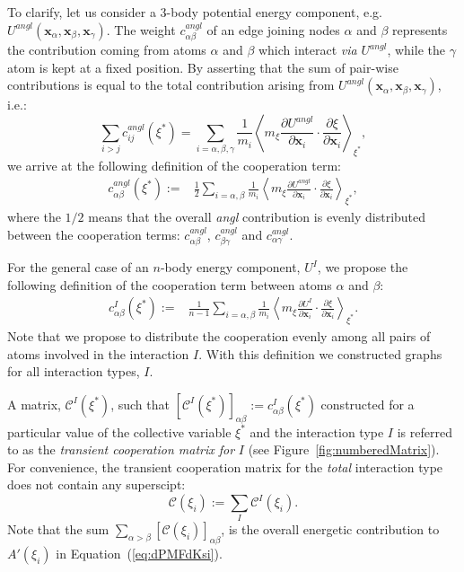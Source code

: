 \documentclass[a4paper,11pt,twoside]{book}%
\begin{document}
To clarify, let us consider a 3-body potential energy component, e.g. $U^{angl}(\mathbf{x}_\alpha,\mathbf{x}_\beta,\mathbf{x}_\gamma)$.
The weight $c^{angl}_{\alpha\beta}$ of an edge joining nodes $\alpha$ and $\beta$  represents the contribution coming from atoms $\alpha$ and $\beta$ which interact \emph{via} $U^{angl}$, while the $\gamma$ atom is kept at a fixed position.
By asserting that the sum of pair-wise contributions is equal to the total contribution arising from $U^{angl}(\mathbf{x}_\alpha,\mathbf{x}_\beta,\mathbf{x}_\gamma)$, i.e.:
$$\sum_{i>j}c^{angl}_{ij}(\xi^*)=\sum_{i=\alpha,\beta,\gamma}\frac{1}{m_i} \left\langle m_\xi \frac{\partial U^{angl}}{\partial \mathbf{x}_i}\cdot\frac{\partial\xi}{\partial\mathbf{x}_i} \right\rangle_{\xi^*},$$
we arrive at the following definition of the cooperation term:
\begin{align}
\nonumber c_{\alpha\beta}^{angl}(\xi^*):=&\frac{1}{2}\sum_{i=\alpha,\beta}\frac{1}{m_i} \left\langle m_\xi \frac{\partial U^{angl}}{\partial \mathbf{x}_i}\cdot\frac{\partial\xi}{\partial\mathbf{x}_i} \right\rangle_{\xi^*},
\end{align}
where the $1/2$ means that the overall \emph{angl} contribution is evenly distributed between the cooperation terms: $c_{\alpha\beta}^{angl}$, $c_{\beta\gamma}^{angl}$ and $c_{\alpha\gamma}^{angl}$.

For the general case of an $n$-body energy component, $U^I$, we propose the following definition of the cooperation term between atoms $\alpha$ and $\beta$:
\begin{align}
\nonumber c_{\alpha\beta}^{I}(\xi^*):=&\frac{1}{n-1}\sum_{i=\alpha,\beta}\frac{1}{m_i} \left\langle m_\xi \frac{\partial U^{I}}{\partial \mathbf{x}_i}\cdot\frac{\partial\xi}{\partial\mathbf{x}_i} \right\rangle_{\xi^*}.
\end{align}
Note that we propose to distribute the cooperation evenly among all pairs of atoms involved in the interaction $I$.
With this definition we constructed graphs for all interaction types, $I$.

A matrix, $\mathcal{C}^{I}(\xi^*)$, such that $[\mathcal{C}^I(\xi^*)]_{\alpha\beta}:=c^I_{\alpha\beta}(\xi^*)$ constructed for a particular value of the collective variable $\xi^*$ and the interaction type $I$ is referred to as the \emph{transient cooperation matrix for} $I$ {\color{black}(see Figure~\ref{fig:numberedMatrix})}.
For convenience, the transient cooperation matrix for the \emph{total} interaction type does not contain any superscipt: $$\mathcal{C}(\xi_i):=\sum_I\mathcal{C}^I(\xi_i).$$
Note that the sum $\sum_{\alpha>\beta}[\mathcal{C}(\xi_i)]_{\alpha\beta}$, is the overall energetic contribution to $A'(\xi_i)$ in Equation~(\ref{eq:dPMFdKsi}).
\end{document}
